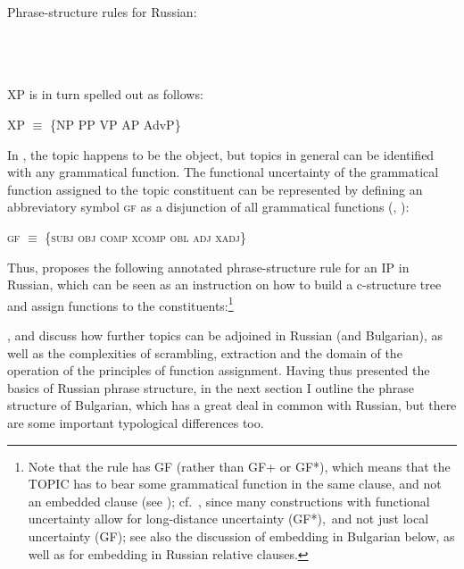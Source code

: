 \documentclass[output=paper,hidelinks]{langscibook}
\begin{document}
\ea Phrase-structure rules for Russian:\\%
\\
\\
\\
\z

XP is in turn spelled out as follows:
  
\ea%
    \label{ex:Slavic:10}
XP ${\equiv}$ \{NP {\textbar} PP {\textbar} VP {\textbar} AP {\textbar} AdvP\}
    \z

          

In , the topic happens to be the object, but topics in general can be identified with any grammatical function. The functional uncertainty of the grammatical function assigned to the topic constituent can be represented by defining an abbreviatory symbol \textsc{gf} as a disjunction of all grammatical functions (\citealt[139--140]{dalrymple01}, \citealt[205--206]{DLM:LFG}):

\ea
\textsc{gf ${\equiv}$ \{subj {\textbar} obj {\textbar} \OBJTHETA {\textbar} comp {\textbar} xcomp {\textbar} obl {\textbar} adj {\textbar} xadj\}}
\z

Thus, \citet[204]{King95} proposes the following annotated phrase-structure rule for an IP in Russian, which can be seen as an instruction on how to build a c-structure tree and assign functions to the constituents:\footnote{Note that the rule has GF (rather than GF+ or GF*), which means that the TOPIC has to bear some grammatical function in the same clause, and not an embedded clause (see \citealt[126]{DLM:LFG}); cf.\ , since many constructions with functional uncertainty allow for long-distance uncertainty (GF*),~and not just local uncertainty (GF); see also the discussion of embedding in Bulgarian below, as well as \citet[223--225]{DLM:LFG} for embedding in Russian relative clauses.}

\ea%
    \label{ex:Slavic:12}
    \z

\citet{King1994,King95}, \citet[70--71, 204--210]{BresnanEtAl2016} and \citet[113--114]{DLM:LFG} discuss how further topics can be adjoined in Russian (and Bulgarian), as well as the complexities of scrambling, extraction and the domain of the operation of the principles of function assignment. Having thus presented the basics of Russian phrase structure, in the next section I outline the phrase structure of Bulgarian, which has a great deal in common with Russian, but there are some important typological differences too.
\end{document}
